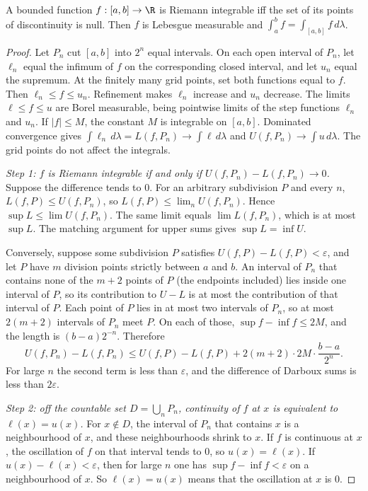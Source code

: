 \begin{theorem}[Lebesgue, 1902]\label{thm:lebesguecriterion}
A bounded function \(f:[a,b]\to\R\) is Riemann integrable iff the set of its points of discontinuity is null. Then \(f\) is Lebesgue measurable and
\(\int_a^bf=\int_{[a,b]}f\,d\lambda\).
\end{theorem}
\begin{proof}
Let \(P_n\) cut \([a,b]\) into \(2^n\) equal intervals. On each open interval of \(P_n\), let \(\ell_n\) equal the infimum of \(f\) on the corresponding closed interval, and let \(u_n\) equal the supremum. At the finitely many grid points, set both functions equal to \(f\). Then \(\ell_n\le f\le u_n\). Refinement makes \(\ell_n\) increase and \(u_n\) decrease. The limits \(\ell\le f\le u\) are Borel measurable, being pointwise limits of the step functions \(\ell_n\) and \(u_n\). If \(|f|\le M\), the constant \(M\) is integrable on \([a,b]\). Dominated convergence gives \(\int\ell_n\,d\lambda=L(f,P_n)\to\int\ell\,d\lambda\) and \(U(f,P_n)\to\int u\,d\lambda\). The grid points do not affect the integrals.

\emph{Step 1: \(f\) is Riemann integrable if and only if \(U(f,P_n)-L(f,P_n)\to0\).} Suppose the difference tends to \(0\). For an arbitrary subdivision \(P\) and every \(n\), \(L(f,P)\le U(f,P_n)\), so \(L(f,P)\le\lim_nU(f,P_n)\). Hence \(\sup L\le\lim U(f,P_n)\). The same limit equals \(\lim L(f,P_n)\), which is at most \(\sup L\). The matching argument for upper sums gives \(\sup L=\inf U\).

Conversely, suppose some subdivision \(P\) satisfies \(U(f,P)-L(f,P)<\varepsilon\), and let \(P\) have \(m\) division points strictly between \(a\) and \(b\). An interval of \(P_n\) that contains none of the \(m+2\) points of \(P\) (the endpoints included) lies inside one interval of \(P\), so its contribution to \(U-L\) is at most the contribution of that interval of \(P\). Each point of \(P\) lies in at most two intervals of \(P_n\), so at most \(2(m+2)\) intervals of \(P_n\) meet \(P\). On each of those, \(\sup f-\inf f\le2M\), and the length is \((b-a)2^{-n}\). Therefore
\[
U(f,P_n)-L(f,P_n)\le U(f,P)-L(f,P)+2(m+2)\cdot2M\cdot\frac{b-a}{2^n}.
\]
For large \(n\) the second term is less than \(\varepsilon\), and the difference of Darboux sums is less than \(2\varepsilon\).

\emph{Step 2: off the countable set \(D=\bigcup_nP_n\), continuity of \(f\) at \(x\) is equivalent to \(\ell(x)=u(x)\).} For \(x\notin D\), the interval of \(P_n\) that contains \(x\) is a neighbourhood of \(x\), and these neighbourhoods shrink to \(x\). If \(f\) is continuous at \(x\), the oscillation of \(f\) on that interval tends to \(0\), so \(u(x)=\ell(x)\). If \(u(x)-\ell(x)<\varepsilon\), then for large \(n\) one has \(\sup f-\inf f<\varepsilon\) on a neighbourhood of \(x\). So \(\ell(x)=u(x)\) means that the oscillation at \(x\) is \(0\).


\end{proof}

